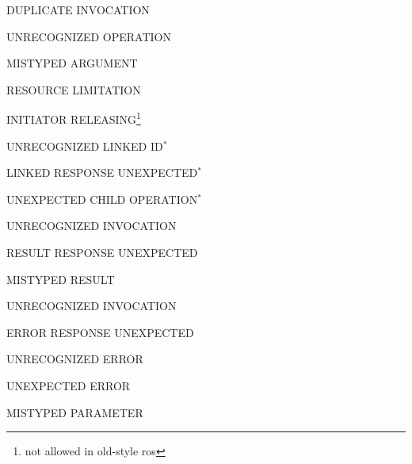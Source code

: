 \begin{bwslide}

\begin{nrtc}
\item	DUPLICATE INVOCATION

\item	UNRECOGNIZED OPERATION

\item	MISTYPED ARGUMENT

\item	RESOURCE LIMITATION

\item	INITIATOR RELEASING\footnote{not allowed in old-style ros}

\item	UNRECOGNIZED LINKED ID$^*$

\item	LINKED RESPONSE UNEXPECTED$^*$

\item	UNEXPECTED CHILD OPERATION$^*$
\end{nrtc}
\end{bwslide}


\begin{bwslide}

\begin{nrtc}
\item	UNRECOGNIZED INVOCATION

\item	RESULT RESPONSE UNEXPECTED

\item	MISTYPED RESULT
\end{nrtc}
\end{bwslide}


\begin{bwslide}

\begin{nrtc}
\item	UNRECOGNIZED INVOCATION

\item	ERROR RESPONSE UNEXPECTED

\item	UNRECOGNIZED ERROR

\item	UNEXPECTED ERROR

\item	MISTYPED PARAMETER
\end{nrtc}
\end{bwslide}


